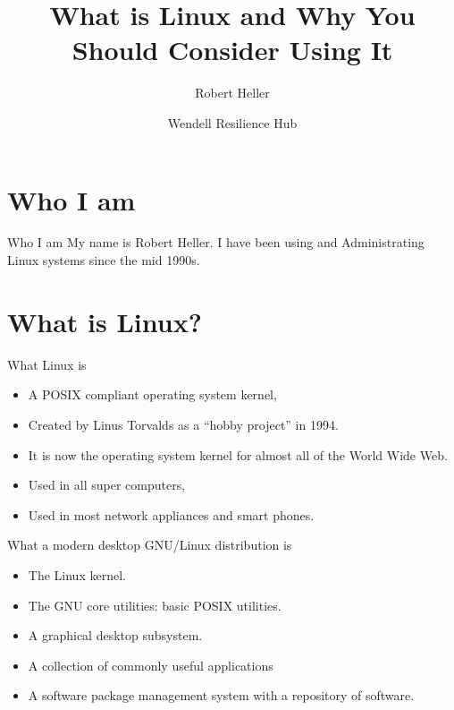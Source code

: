 \documentclass[aspectratio=169]{beamer}
\title{What is Linux and Why You Should Consider Using It}
\author{Robert Heller}
\date{Wendell Resilience Hub}
\begin{document}
\frame{\titlepage}

\section{Who I am}
\begin{frame}[fragile]{Who I am}
My name is Robert Heller.  I have been using and Administrating Linux 
systems since the mid 1990s. 
\end{frame}

\section{What is Linux?}

\begin{frame}[fragile]{What Linux is}

    \begin{itemize}
        \item
            A POSIX compliant operating system kernel,
        \pause 
        \item
            Created by Linus Torvalds as a ``hobby project'' in 1994.
        \pause
        \item
            It is now the operating system kernel for almost all of the 
            World Wide Web.
        \pause
        \item
            Used in all super computers,
        \pause
        \item
            Used in most network appliances and smart phones.
    \end{itemize}
\end{frame} 

\begin{frame}[fragile]{What a modern desktop GNU/Linux distribution is}
    \begin{itemize}
        \item
            The Linux kernel.
        \pause
        \item
            The GNU core utilities: basic POSIX utilities.
        \pause
        \item
            A graphical desktop subsystem.
        \pause
        \item
            A collection of commonly useful applications
        \pause
        \item
            A software package management system with a repository of 
            software.
     \end{itemize}
\end{frame}
\end{document}
